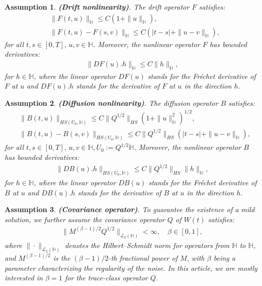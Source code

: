 \documentclass[preprint,12pt]{elsarticle}
\newtheorem{assumption}{Assumption}
\begin{document}
	\begin{assumption}\label{assump2}{\bf(Drift nonlinearity)}.
		The drift operator \( F \) satisfies:
		\begin{align*}
			&\|F(t,u)\|_{\mathbb{H}} \leq C(1 + \|u\|_{\mathbb{H}}), \\
			&\|F(t,u) - F(s,v)\|_{\mathbb{H}} \leq C(|t - s| + \|u - v\|_{\mathbb{H}}),
		\end{align*}
		for all \( t,s \in [0,T], \, u, v \in \mathbb{H} \). Moreover, the nonlinear operator \( F \) has bounded derivatives:
		\begin{align*}
			\|DF(u).h\|_{\mathbb{H}} \leq C \|h\|_{\mathbb{H}},
		\end{align*}
		for \( h \in \mathbb{H} \), where the linear operator  \(DF(u)\)  stands for the Fréchet derivative of  \(F\)  at  \(u\)  and  \(DF(u).h\)  stands for the derivative of \(F\)  at  \(u\)  in the direction \(h\).
	\end{assumption}
	
	\begin{assumption}\label{assump3}{\bf(Diffusion nonlinearity)}.
		The diffusion operator \( B \) satisfies:
		\begin{align*}
			&\|B(t,u)\|_{HS(U_0, \mathbb{H})} \leq C \|Q^{1/2}\|_{HS}(1 + \|u\|_{\mathbb{H}}^2)^{1/2}, \\
			&\|B(t,u) - B(s,v)\|_{HS(U_0, \mathbb{H})} \leq C \|Q^{1/2}\|_{HS}(|t - s| + \|u - v\|_{\mathbb{H}}),
		\end{align*}
		for all \( t, s \in [0,T], \, u, v \in \mathbb{H}, U_0 := Q^{1/2} \mathbb{H} \). Moreover, the nonlinear operator \( B \) has bounded derivatives:
		\begin{align*}
			\|DB(u).h\|_{HS(U_0, \mathbb{H})} \leq C \|Q^{1/2}\|_{HS} \|h\|_{\mathbb{H}},
		\end{align*}
		for \( h \in \mathbb{H} \),  where the linear operator  \(DB(u)\)  stands for the Fréchet derivative of  \(B\)  at  \(u\)  and  \(DB(u).h\)  stands for the derivative of \(B\) at \(u\)  in the direction \(h\). 
	\end{assumption}
	
	\begin{assumption}\label{assump4}\cite{Yan2005}{\bf(Covariance operator)}. 
		To guarantee the existence of a mild solution, we further assume the covariance operator \( Q \) of \( W(t) \) satisfies:
		\begin{align*}
			\|M^{(\beta - 1)/2} Q^{1/2}\|_{\mathcal{L}_2(\mathbb{H})} < \infty, \quad \beta \in [0, 1],
		\end{align*}
		where \( \|\cdot\|_{\mathcal{L}_2(\mathbb{H})} \) denotes the Hilbert–Schmidt norm for operators from \( \mathbb{H} \) to \( \mathbb{H} \), and \( M^{(\beta - 1)/2} \) is the \( (\beta - 1)/2 \)-th fractional power of \( M \), with \( \beta \) being a parameter characterizing the regularity of the noise. In this article, we are mostly interested in \( \beta = 1 \) for the trace-class operator \( Q \).
	\end{assumption}
	
\end{document}
